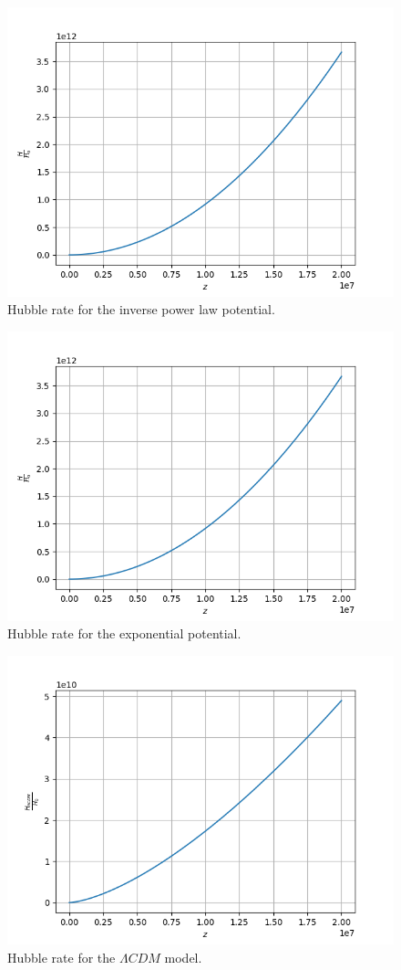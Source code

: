 \documentclass[a4paper,10pt]{article}
\begin{document}
\begin{figure}[H]
\centering
\includegraphics[width=12cm]{H_rate_ipl.png}
\caption{Hubble rate for the inverse power law potential.}
\label{fig:h_rate_ipl}
\end{figure}
\begin{figure}[H]
\centering
\includegraphics[width=12cm]{H_rate_exp.png}
\caption{Hubble rate for the exponential potential.}
\label{fig:h_rate_exp}
\end{figure}
\begin{figure}[H]
\centering
\includegraphics[width=12cm]{H_rate_LCDM.png}
\caption{Hubble rate for the $\Lambda CDM$ model.}
\label{fig:h_rate_lcdm}
\end{figure}
\end{document}
